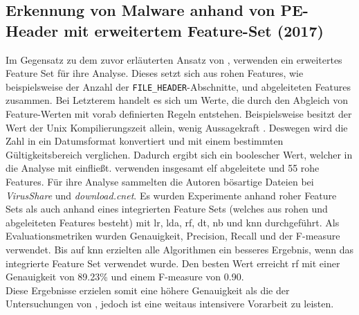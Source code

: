 \documentclass[
    12pt, %
    DIV10,
    ngerman, %
    a4paper, %
    oneside, %
    titlepage, %
    parskip=half, %
    headings=normal, %
    listof=totoc, %
    bibliography=totoc, %
    index=totoc, %
    captions=tableheading, %
    final %
]{scrreprt}
\begin{document}
\subsection{Erkennung von Malware anhand von PE-Header mit erweitertem Feature-Set (2017)}
Im Gegensatz zu dem zuvor erläuterten Ansatz von \textcite{Raff2017}, verwenden \textcite{Kumar2017} ein erweitertes Feature Set für ihre Analyse. Dieses setzt sich aus rohen Features, wie beispielsweise der Anzahl der \texttt{FILE\_HEADER}-Abschnitte, und abgeleiteten Features zusammen. Bei Letzterem handelt es sich um Werte, die durch den Abgleich von Feature-Werten mit vorab definierten Regeln entstehen. Beispielsweise besitzt der Wert der Unix Kompilierungszeit allein, wenig Aussagekraft \parencite{Kumar2017}. Deswegen wird die Zahl in ein Datumsformat konvertiert und mit einem bestimmten Gültigkeitsbereich verglichen. Dadurch ergibt sich ein boolescher Wert, welcher in die Analyse mit einflie{\ss}t. \textcite{Kumar2017} verwenden insgesamt elf abgeleitete und 55 rohe Features. Für ihre Analyse sammelten die Autoren bösartige Dateien bei \emph{VirusShare} und \emph{download.cnet}. Es wurden Experimente anhand roher Feature Sets als auch anhand eines integrierten Feature Sets (welches aus rohen und abgeleiteten Features besteht) mit \ac{lr}, \ac{lda}, \ac{rf}, \ac{dt}, \ac{nb} und \ac{knn} durchgeführt. Als Evaluationsmetriken wurden Genauigkeit, Precision, Recall und der F-measure verwendet. Bis auf \ac{knn} erzielten alle Algorithmen ein besseres Ergebnis, wenn das integrierte Feature Set verwendet wurde. Den besten Wert erreicht \ac{rf} mit einer Genauigkeit von 89.23\% und einem F-measure von 0.90. \\
Diese Ergebnisse erzielen somit eine höhere Genauigkeit als die der Untersuchungen von \textcite{Raff2017}, jedoch ist eine weitaus intensivere Vorarbeit zu leisten.
%
\end{document}
